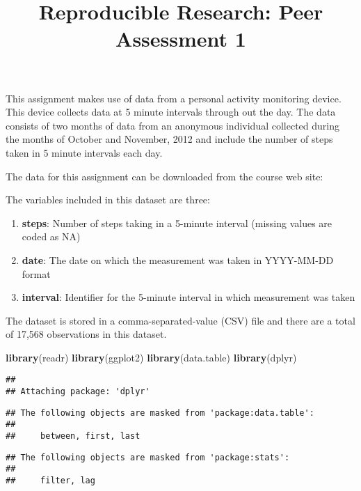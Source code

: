 \documentclass[]{article}
\title{Reproducible Research: Peer Assessment 1}
\author{}
\date{}
\newenvironment{Shaded}{\begin{snugshade}}{\end{snugshade}}
\newcommand{\KeywordTok}[1]{\textcolor[rgb]{0.13,0.29,0.53}{\textbf{#1}}}
\newcommand{\NormalTok}[1]{#1}
\begin{document}
\maketitle

This assignment makes use of data from a personal activity monitoring
device. This device collects data at 5 minute intervals through out the
day. The data consists of two months of data from an anonymous
individual collected during the months of October and November, 2012 and
include the number of steps taken in 5 minute intervals each day.

The data for this assignment can be downloaded from the course web site:

The variables included in this dataset are three:

\begin{enumerate}
\def\labelenumi{\arabic{enumi}.}
\item
  \textbf{steps}: Number of steps taking in a 5-minute interval (missing
  values are coded as \color{red}{\verb|NA|}NA)
\item
  \textbf{date}: The date on which the measurement was taken in
  YYYY-MM-DD format
\item
  \textbf{interval}: Identifier for the 5-minute interval in which
  measurement was taken
\end{enumerate}

The dataset is stored in a comma-separated-value (CSV) file and there
are a total of 17,568 observations in this dataset.

\begin{Shaded}
\begin{Highlighting}[]
\KeywordTok{library}\NormalTok{(readr)}
\KeywordTok{library}\NormalTok{(ggplot2)}
\KeywordTok{library}\NormalTok{(data.table)}
\KeywordTok{library}\NormalTok{(dplyr)}
\end{Highlighting}
\end{Shaded}

\begin{verbatim}
## 
## Attaching package: 'dplyr'
\end{verbatim}

\begin{verbatim}
## The following objects are masked from 'package:data.table':
## 
##     between, first, last
\end{verbatim}

\begin{verbatim}
## The following objects are masked from 'package:stats':
## 
##     filter, lag
\end{verbatim}
\end{document}
